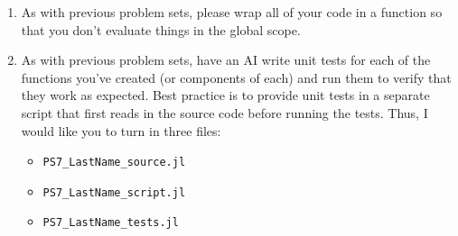 \documentclass[12pt,english]{article}
\begin{document}
\begin{enumerate}
\item As with previous problem sets, please wrap all of your code in a function so that you don't evaluate things in the global scope.


\item As with previous problem sets, have an AI write unit tests for each of the functions you've created (or components of each) and run them to verify that they work as expected. Best practice is to provide unit tests in a separate script that first reads in the source code before running the tests. Thus, I would like you to turn in three files:
    \begin{itemize}
        \item \texttt{PS7\_LastName\_source.jl}
        \item \texttt{PS7\_LastName\_script.jl}
        \item \texttt{PS7\_LastName\_tests.jl}
    \end{itemize}

\end{enumerate}
\end{document}
